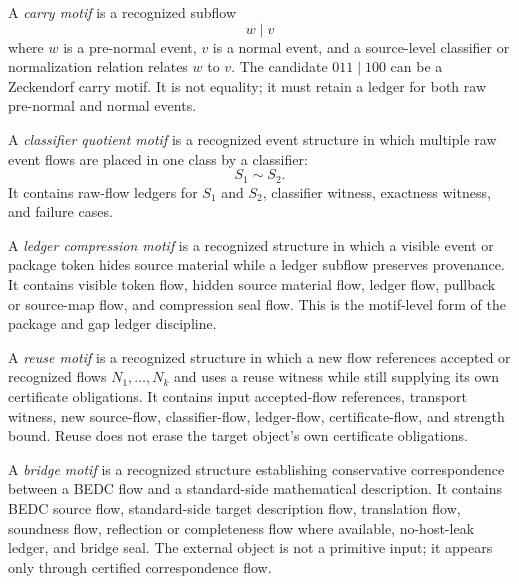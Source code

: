 \begin{definition}
\label{def:motif-generated-carry}
A \emph{carry motif} is a recognized subflow
$$
  w\mid v
$$
where $w$ is a pre-normal event, $v$ is a normal event, and a source-level classifier or normalization relation relates $w$ to $v$. The candidate $011\mid 100$ can be a Zeckendorf carry motif. It is not equality; it must retain a ledger for both raw pre-normal and normal events.
\end{definition}

\begin{definition}
\label{def:motif-generated-classifier-quotient}
A \emph{classifier quotient motif} is a recognized event structure in which multiple raw event flows are placed in one class by a classifier:
$$
  S_1\sim S_2.
$$
It contains raw-flow ledgers for $S_1$ and $S_2$, classifier witness, exactness witness, and failure cases.
\end{definition}

\begin{definition}
\label{def:motif-generated-ledger-compression}
A \emph{ledger compression motif} is a recognized structure in which a visible event or package token hides source material while a ledger subflow preserves provenance. It contains visible token flow, hidden source material flow, ledger flow, pullback or source-map flow, and compression seal flow. This is the motif-level form of the package and gap ledger discipline.
\end{definition}

\begin{definition}
\label{def:motif-generated-reuse}
A \emph{reuse motif} is a recognized structure in which a new flow references accepted or recognized flows $N_1,\ldots,N_k$ and uses a reuse witness while still supplying its own certificate obligations. It contains input accepted-flow references, transport witness, new source-flow, classifier-flow, ledger-flow, certificate-flow, and strength bound. Reuse does not erase the target object's own certificate obligations.
\end{definition}

\begin{definition}
\label{def:motif-generated-bridge}
A \emph{bridge motif} is a recognized structure establishing conservative correspondence between a BEDC flow and a standard-side mathematical description. It contains BEDC source flow, standard-side target description flow, translation flow, soundness flow, reflection or completeness flow where available, no-host-leak ledger, and bridge seal. The external object is not a primitive input; it appears only through certified correspondence flow.
\end{definition}

